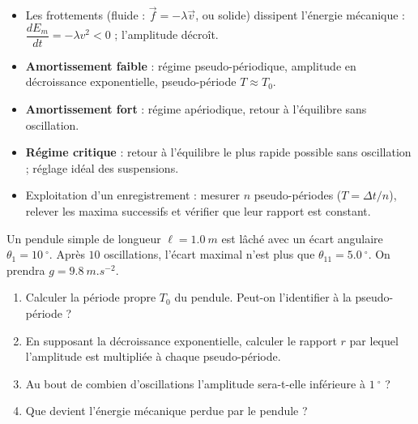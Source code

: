 \documentclass[11pt]{article}
\providecommand{\degree}{^{\circ}}
\begin{document}
\begin{aretenir}
\begin{itemize}
\item Les frottements (fluide : $\vec{f} = -\lambda\vec{v}$, ou solide) dissipent l'énergie mécanique : $\dfrac{dE_m}{dt} = -\lambda v^2 < 0$ ; l'amplitude décroît.
\item \textbf{Amortissement faible} : régime pseudo-périodique, amplitude en décroissance exponentielle, pseudo-période $T \approx T_0$.
\item \textbf{Amortissement fort} : régime apériodique, retour à l'équilibre sans oscillation.
\item \textbf{Régime critique} : retour à l'équilibre le plus rapide possible sans oscillation ; réglage idéal des suspensions.
\item Exploitation d'un enregistrement : mesurer $n$ pseudo-périodes ($T = \Delta t/n$), relever les maxima successifs et vérifier que leur rapport est constant.
\end{itemize}
\end{aretenir}

\begin{exercice}
Un pendule simple de longueur $\ell = \SI{1,0}{m}$ est lâché avec un écart angulaire $\theta_1 = \SI{10}{\degree}$. Après $10$ oscillations, l'écart maximal n'est plus que $\theta_{11} = \SI{5,0}{\degree}$. On prendra $g = \SI{9,8}{m.s^{-2}}$.
\begin{enumerate}
\item Calculer la période propre $T_0$ du pendule. Peut-on l'identifier à la pseudo-période ?
\item En supposant la décroissance exponentielle, calculer le rapport $r$ par lequel l'amplitude est multipliée à chaque pseudo-période.
\item Au bout de combien d'oscillations l'amplitude sera-t-elle inférieure à $\SI{1}{\degree}$ ?
\item Que devient l'énergie mécanique perdue par le pendule ?
\end{enumerate}
\end{exercice}
\end{document}
